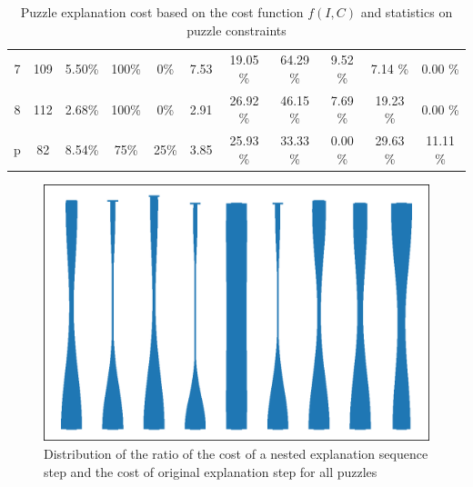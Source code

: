 \begin{table}
\begin{tabular}{c|cc|cc|c|ccccc}
		7          & 109                & 5.50\%             & 100\%                                              & 0\%                   & 7.53                                                                   & 19.05 \%      & 64.29 \%        & 9.52 \%       & 7.14 \%            & 0.00 \%      \\
		8          & 112                & 2.68\%             & 100\%                                              & 0\%                   & 2.91                                                                   & 26.92 \%      & 46.15 \%        & 7.69 \%       & 19.23 \%           & 0.00 \%      \\
		p          & 82                 & 8.54\%             & 75\%                                               & 25\%                  & 3.85                                                                   & 25.93 \%      & 33.33 \%        & 0.00 \%       & 29.63 \%           & 11.11 \%
	\end{tabular}
	\caption{Puzzle explanation cost based on the cost function $f(I, C)$ and statistics on puzzle constraints}

	\label{table:nested_explanation}

\end{table}


\begin{figure}[]
	\centering
	\includegraphics[width=.7\textwidth]{figures/violin_plot.eps}
	\caption{Distribution of the ratio of the cost of a nested explanation sequence step and the cost of original explanation step for all puzzles}
	\label{fig:experiments:violin}
\end{figure}


